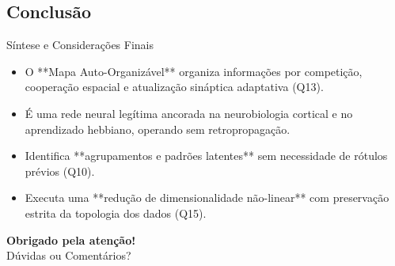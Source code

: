 \documentclass[aspectratio=169]{beamer}
\begin{document}
	\subsection{Conclusão}
	\begin{frame}{Síntese e Considerações Finais}
		\begin{itemize}
			\item O **Mapa Auto-Organizável** organiza informações por competição, cooperação espacial e atualização sináptica adaptativa (Q13).
			\item É uma rede neural legítima ancorada na neurobiologia cortical e no aprendizado hebbiano, operando sem retropropagação.
			\item Identifica **agrupamentos e padrões latentes** sem necessidade de rótulos prévios (Q10).
			\item Executa uma **redução de dimensionalidade não-linear** com preservação estrita da topologia dos dados (Q15).
		\end{itemize}
		
		\vspace{0.6cm}
		\centering
		\textbf{Obrigado pela atenção!} \\
		\vspace{0.2cm}
		\footnotesize Dúvidas ou Comentários?
	\end{frame}
	
\end{document}
